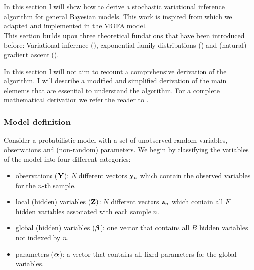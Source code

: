 In this section I will show how to derive a stochastic variational inference algorithm for general Bayesian models. This work is inspired from \cite{Hoffman2012} which we adapted and implemented in the MOFA model.\\
This section builds upon three theoretical fundations that have been introduced before: Variational inference (), exponential family distributions () and (natural) gradient ascent ().

In this section I will not aim to recount a comprehensive derivation of the algorithm. I will describe a modified and simplified derivation of the main elements that are essential to understand the algorithm. For a complete mathematical derivation we refer the reader to \cite{Hoffman2012}.


\subsubsection{Model definition}

Consider a probabilistic model with a set of unobserved random variables, observations and (non-random) parameters. We begin by classifying the variables of the model into four different categories:

\begin{itemize}
	\itemsep-1.5em
	\item observations (${\bf Y}$): $N$ different vectors ${\bf y}_{n}$ which contain the observed variables for the $n$-th sample. \\
	\item local (hidden) variables (${\bf Z})$: $N$ different vectors ${\bf z}_{n}$ which contain all $K$ hidden variables associated with each sample $n$. \\
	\item global (hidden) variables ($\mbox{\boldmath $\beta$}$): one vector that contains all $B$ hidden variables not indexed by $n$. \\
	\item parameters ($\mbox{\boldmath $\alpha$}$): a vector that contains all fixed parameters for the global variables.
\end{itemize}

